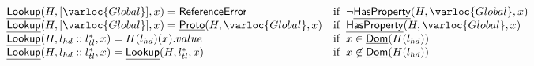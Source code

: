 \[\begin{array}{ll}
\begin{array}{ll}
  \chf{Lookup}(H,[\varloc{Global}],x)
  =  \exc{ReferenceError} & \ifc{\lnot\chf{HasProperty}(H,\varloc{Global},x)} \\
  \chf{Lookup}(H,[\varloc{Global}],x)
  =  \chf{Proto}(H, \varloc{Global}, x) & \ifc{\chf{HasProperty}(H,\varloc{Global},x)}\\
  \chf{Lookup}(H,l_{hd}::l_{tl}^{*},x)
   =  H(l_{hd})(x).value & \ifc{x\in\chf{Dom}(H(l_{hd}))} \\
   \chf{Lookup}(H,l_{hd}::l_{tl}^{*},x)
   =  \chf{Lookup}(H, l_{tl}^{*},x) & \ifc{x\not\in\chf{Dom}(H(l_{hd}))}\\
\end{array}\\
\\
\end{array}
\]
